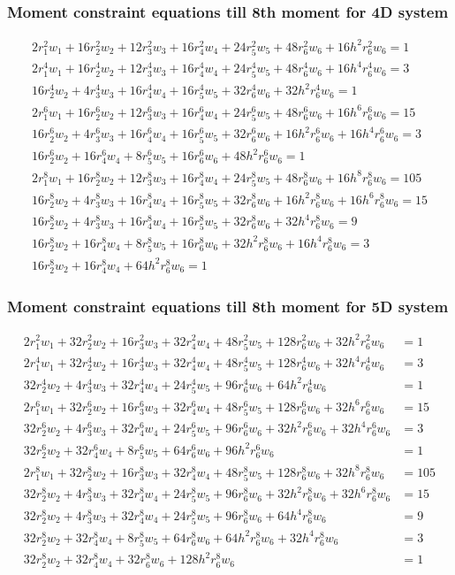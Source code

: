 \documentclass{beamer}
\begin{document}
\begin{frame}
\frametitle{Moment constraint equations till 8th moment for 4D system}
\small
\begin{align*}
2r_1^2w_1+16r_2^2w_2+12r_3^2w_3+16r_4^2w_4+24r_5^2w_5+48r_6^2w_6+16h^2r_6^2w_6=1\\
2r_1^4w_1+16r_2^4w_2+12r_3^4w_3+16r_4^4w_4+24r_5^4w_5+48r_6^4w_6+16h^4r_6^4w_6=3\\
16r_2^4w_2+4r_3^4w_3+16r_4^4w_4+16r_5^4w_5+32r_6^4w_6+32h^2r_6^4w_6=1\\
2r_1^6w_1+16r_2^6w_2+12r_3^6w_3+16r_4^6w_4+24r_5^6w_5+48r_6^6w_6+16h^6r_6^6w_6=15\\
16r_2^6w_2+4r_3^6w_3+16r_4^6w_4+16r_5^6w_5+32r_6^6w_6+16h^2r_6^6w_6+16h^4r_6^6w_6=3\\
16r_2^6w_2+16r_4^6w_4+8r_5^6w_5+16r_6^6w_6+48h^2r_6^6w_6=1\\
2r_1^8w_1+16r_2^8w_2+12r_3^8w_3+16r_4^8w_4+24r_5^8w_5+48r_6^8w_6+16h^8r_6^8w_6=105\\
16r_2^8w_2+4r_3^8w_3+16r_4^8w_4+16r_5^8w_5+32r_6^8w_6+16h^2r_6^8w_6+16h^6r_6^8w_6=15\\
16r_2^8w_2+4r_3^8w_3+16r_4^8w_4+16r_5^8w_5+32r_6^8w_6+32h^4r_6^8w_6=9\\
16r_2^8w_2+16r_4^8w_4+8r_5^8w_5+16r_6^8w_6+32h^2r_6^8w_6+16h^4r_6^8w_6=3\\
16r_2^8w_2+16r_4^8w_4+64h^2r_6^8w_6=1
\end{align*}     
\end{frame}
\begin{frame}
\frametitle{Moment constraint equations till 8th moment for 5D system}
\small
\begin{align*}
2r_1^2w_1+32r_2^2w_2+16r_3^2w_3+32r_4^2w_4+48r_5^2w_5+128r_6^2w_6+32h^2r_6^2w_6&=1\\
2r_1^4w_1+32r_2^4w_2+16r_3^4w_3+32r_4^4w_4+48r_5^4w_5+128r_6^4w_6+32h^4r_6^4w_6&=3\\
32r_2^4w_2+4r_3^4w_3+32r_4^4w_4+24r_5^4w_5+96r_6^4w_6+64h^2r_6^4w_6&=1\\
2r_1^6w_1+32r_2^6w_2+16r_3^6w_3+32r_4^6w_4+48r_5^6w_5+128r_6^6w_6+32h^6r_6^6w_6&=15\\
32r_2^6w_2+4r_3^6w_3+32r_4^6w_4+24r_5^6w_5+96r_6^6w_6+32h^2r_6^6w_6+32h^4r_6^6w_6&=3\\
32r_2^6w_2+32r_4^6w_4+8r_5^6w_5+64r_6^6w_6+96h^2r_6^6w_6&=1\\
2r_1^8w_1+32r_2^8w_2+16r_3^8w_3+32r_4^8w_4+48r_5^8w_5+128r_6^8w_6+32h^8r_6^8w_6&=105\\
32r_2^8w_2+4r_3^8w_3+32r_4^8w_4+24r_5^8w_5+96r_6^8w_6+32h^2r_6^8w_6+32h^6r_6^8w_6&=15\\
32r_2^8w_2+4r_3^8w_3+32r_4^8w_4+24r_5^8w_5+96r_6^8w_6+64h^4r_6^8w_6&=9\\
32r_2^8w_2+32r_4^8w_4+8r_5^8w_5+64r_6^8w_6+64h^2r_6^8w_6+32h^4r_6^8w_6&=3\\
32r_2^8w_2+32r_4^8w_4+32r_6^8w_6+128h^2r_6^8w_6&=1\\
\end{align*}
\end{frame}
\end{document}
